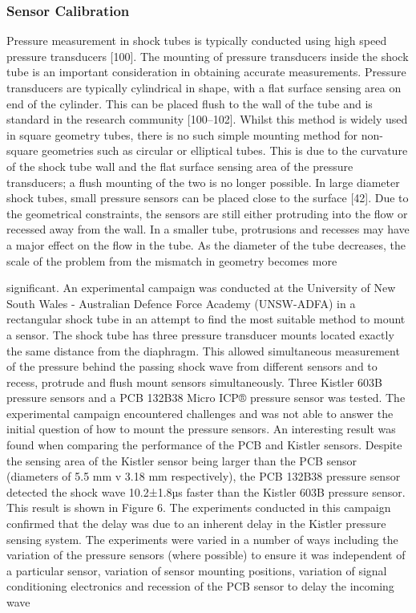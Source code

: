 \subsubsection{Sensor Calibration}
\cite{knight1958piezoelectric}
\cite{knight1958piezoelectric, anderson2000shock,ryu1995shock} 

Pressure measurement in shock tubes is typically conducted using high speed pressure transducers [100]. The
mounting of pressure transducers inside the shock tube is an important consideration in obtaining accurate
measurements. Pressure transducers are typically cylindrical in shape, with a flat surface sensing area on end
of the cylinder. This can be placed flush to the wall of the tube and is standard in the research community
[100–102]. Whilst this method is widely used in square geometry tubes, there is no such simple mounting
method for non-square geometries such as circular or elliptical tubes. This is due to the curvature of the shock
tube wall and the flat surface sensing area of the pressure transducers; a flush mounting of the two is no longer
possible. In large diameter shock tubes, small pressure sensors can be placed close to the surface [42]. Due
to the geometrical constraints, the sensors are still either protruding into the flow or recessed away from
the wall. In a smaller tube, protrusions and recesses may have a major effect on the flow in the tube. As
the diameter of the tube decreases, the scale of the problem from the mismatch in geometry becomes more

significant.
An experimental campaign was conducted at the University of New South Wales - Australian Defence
Force Academy (UNSW-ADFA) in a rectangular shock tube in an attempt to find the most suitable method
to mount a sensor. The shock tube has three pressure transducer mounts located exactly the same distance
from the diaphragm. This allowed simultaneous measurement of the pressure behind the passing shock wave
from different sensors and to recess, protrude and flush mount sensors simultaneously. Three Kistler 603B
pressure sensors and a PCB 132B38 Micro ICP® pressure sensor was tested.
The experimental campaign encountered challenges and was not able to answer the initial question of
how to mount the pressure sensors. An interesting result was found when comparing the performance of the
PCB and Kistler sensors. Despite the sensing area of the Kistler sensor being larger than the PCB sensor
(diameters of 5.5 mm v 3.18 mm respectively), the PCB 132B38 pressure sensor detected the shock wave
10.2±1.8µs faster than the Kistler 603B pressure sensor. This result is shown in Figure 6. The experiments
conducted in this campaign confirmed that the delay was due to an inherent delay in the Kistler pressure
sensing system. The experiments were varied in a number of ways including the variation of the pressure
sensors (where possible) to ensure it was independent of a particular sensor, variation of sensor mounting
positions, variation of signal conditioning electronics and recession of the PCB sensor to delay the incoming
wave

